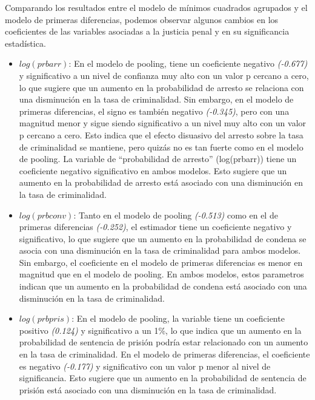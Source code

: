 \documentclass[
  12pt,
]{article}
\begin{document}
Comparando los resultados entre el modelo de mínimos cuadrados agrupados
y el modelo de primeras diferencias, podemos observar algunos cambios en
los coeficientes de las variables asociadas a la justicia penal y en su
significancia estadística.

\begin{itemize}
\item
  \(log(prbarr)\): En el modelo de pooling, tiene un coeficiente
  negativo \emph{(-0.677)} y significativo a un nivel de confianza muy
  alto con un valor p cercano a cero, lo que sugiere que un aumento en
  la probabilidad de arresto se relaciona con una disminución en la tasa
  de criminalidad. Sin embargo, en el modelo de primeras diferencias, el
  signo es también negativo \emph{(-0.345)}, pero con una magnitud menor
  y sigue siendo significativo a un nivel muy alto con un valor p
  cercano a cero. Esto indica que el efecto disuasivo del arresto sobre
  la tasa de criminalidad se mantiene, pero quizás no es tan fuerte como
  en el modelo de pooling. La variable de ``probabilidad de arresto''
  (log(prbarr)) tiene un coeficiente negativo significativo en ambos
  modelos. Esto sugiere que un aumento en la probabilidad de arresto
  está asociado con una disminución en la tasa de criminalidad.
\item
  \(log(prbconv)\): Tanto en el modelo de pooling \emph{(-0.513)} como
  en el de primeras diferencias \emph{(-0.252)}, el estimador tiene un
  coeficiente negativo y significativo, lo que sugiere que un aumento en
  la probabilidad de condena se asocia con una disminución en la tasa de
  criminalidad para ambos modelos. Sin embargo, el coeficiente en el
  modelo de primeras diferencias es menor en magnitud que en el modelo
  de pooling. En ambos modelos, estos parametros indican que un aumento
  en la probabilidad de condena está asociado con una disminución en la
  tasa de criminalidad.
\item
  \(log(prbpris)\): En el modelo de pooling, la variable tiene un
  coeficiente positivo \emph{(0.124)} y significativo a un 1\%, lo que
  indica que un aumento en la probabilidad de sentencia de prisión
  podría estar relacionado con un aumento en la tasa de criminalidad. En
  el modelo de primeras diferencias, el coeficiente es negativo
  \emph{(-0.177)} y significativo con un valor p menor al nivel de
  significancia. Esto sugiere que un aumento en la probabilidad de
  sentencia de prisión está asociado con una disminución en la tasa de
  criminalidad.
\end{itemize}
\end{document}
